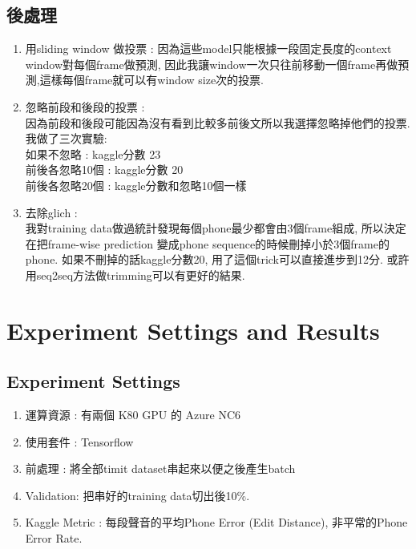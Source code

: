 \documentclass[12pt, a4paper]{article}
\begin{document}
		\subsection{後處理}
			\begin{enumerate}
			\item 用sliding window 做投票 : 
				因為這些model只能根據一段固定長度的context window對每個frame做預測, 因此我讓window一次只往前移動一個frame再做預測,這樣每個frame就可以有window size次的投票.
			\item 忽略前段和後段的投票 :\\ 
				因為前段和後段可能因為沒有看到比較多前後文所以我選擇忽略掉他們的投票.我做了三次實驗:\\ 
				如果不忽略 :		 kaggle分數 23\\
				前後各忽略10個 :   kaggle分數 20\\
				前後各忽略20個 :   kaggle分數和忽略10個一樣
			\item 去除glich :\\
				我對training data做過統計發現每個phone最少都會由3個frame組成,
				所以決定在把frame-wise prediction 變成phone sequence的時候刪掉小於3個frame的phone.
				如果不刪掉的話kaggle分數20, 用了這個trick可以直接進步到12分.
				或許用seq2seq方法做trimming可以有更好的結果.
			\end{enumerate}
	\section{Experiment Settings and Results}
		\subsection{Experiment Settings}
			\begin{enumerate}
				\item 運算資源 : 有兩個 K80 GPU 的 Azure NC6 
				\item 使用套件 : Tensorflow
				\item 前處理 : 
					將全部timit dataset串起來以便之後產生batch
				\item Validation: 把串好的training data切出後10\%.
				\item Kaggle Metric : 
					每段聲音的平均Phone Error (Edit Distance), 非平常的Phone Error Rate.
			\end{enumerate}
\end{document}
